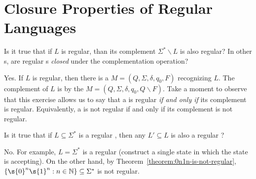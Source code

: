 \section{Closure Properties of Regular Languages}


\begin{flex}
\begin{exercise} \label{exercise:Are-regular-languages-closed-under-complementation}
Is it true that if $L$ is regular, than its complement $\Sigma^* \backslash L$ is also regular? 
In other s, are regular s \emph{closed} under the complementation operation?
\end{exercise}

\begin{solution}
Yes.
If $L$ is regular, then there is a  $M = (Q, \Sigma, \delta, q_0, F)$ recognizing $L$. 
The complement of $L$ is  by the  $M = (Q, \Sigma, \delta, q_0, Q\backslash F)$.
Take a moment to observe that this exercise allows us to say that a  is regular \emph{if and only if} its complement is regular.
Equivalently, a  is not regular if and only if its complement is not regular.
\end{solution}
\end{flex}


\begin{flex}
\begin{exercise} \label{exercise:Are-regular-languages-closed-under-subsets}
Is it true that if $L \subseteq \Sigma^*$ is a regular , then any $L' \subseteq L$ is also a regular ?
\end{exercise}

\begin{solution}
No. 
For example, $L = \Sigma^*$ is a regular  (construct a single state  in which the state is accepting). 
On the other hand, by Theorem~\ref{theorem:0n1n-is-not-regular}, $\{\s{0}^n\s{1}^n : n \in \mathbb{N} \} \subseteq \Sigma^*$ is not regular.
\end{solution}
\end{flex}


